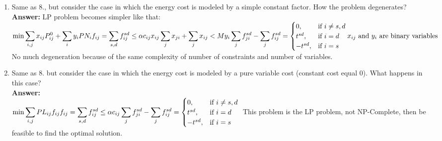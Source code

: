 \documentclass[a4paper]{article}
\begin{document}
\begin{enumerate}
\item Same as 8., but consider the case in which the energy cost is modeled by a simple constant factor. How the problem degenerates?\\
\textbf{Answer:} LP problem becomes simpler like that:\\
\begin{math}
\min{\displaystyle\sum\limits_{i,j} {x_{ij}P_{ij}^0} + \displaystyle\sum\limits_{i} y_i{PN_{i}}} \\
f_{ij} = \displaystyle\sum\limits_{s,d} {f_{ij}^{sd}} \le \alpha c_{ij}x_{ij} \\
\displaystyle\sum\limits_{j} {x_{ji}} + \displaystyle\sum\limits_{j} {x_{ij}} < My_{i}\\
\displaystyle\sum\limits_{j} {f_{ji}^{sd}} - \displaystyle\sum\limits_{j} {f_{ij}^{sd}} =
  \begin{cases}
  0, &\text{if $i \neq s, d$}\\
  t^{sd}, &\text{if $i = d$}\\
  -t^{sd}, &\text{if $i = s$}
  \end{cases} \\
\text{$x_{ij}$ and $y_i$ are binary variables}\\
\end{math}
No much degeneration because of the same complexity of number of constraints and number of variables.
\item Same  as  8.  but  consider  the  case  in  which  the  energy  cost  is  modeled  by  a   pure  variable  cost  (constant  cost  equal  0).  What  happens  in  this  case? \\
\textbf{Answer:} \\
\begin{math}
\min{\displaystyle\sum\limits_{i,j} {PL_{ij}f_{ij}}}  \\
f_{ij} = \displaystyle\sum\limits_{s,d} {f_{ij}^{sd}} \le \alpha c_{ij} \\
\displaystyle\sum\limits_{j} {f_{ji}^{sd}} - \displaystyle\sum\limits_{j} {f_{ij}^{sd}} =
  \begin{cases}
  0, &\text{if $i \neq s, d$}\\
  t^{sd}, &\text{if $i = d$}\\
  -t^{sd}, &\text{if $i = s$}
  \end{cases} \\
\end{math}
This problem is the LP problem, not NP-Complete, then be feasible to find the optimal solution.


\end{enumerate}
\end{document}
